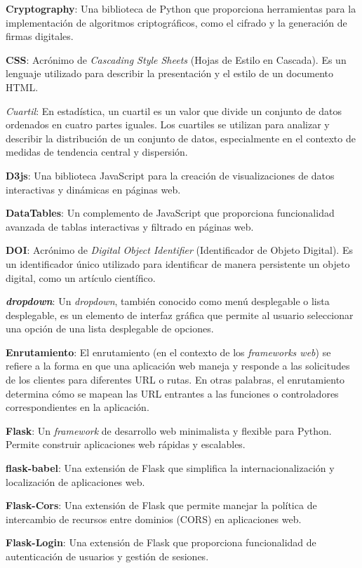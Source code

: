 \textbf{Cryptography}: Una biblioteca de Python que proporciona herramientas para la implementación de algoritmos criptográficos, como el cifrado y la generación de firmas digitales.

\textbf{CSS}: Acrónimo de \textit{Cascading Style Sheets} (Hojas de Estilo en Cascada). Es un lenguaje utilizado para describir la presentación y el estilo de un documento HTML.

\textit{Cuartil}: En estadística, un cuartil es un valor que divide un conjunto de datos ordenados en cuatro partes iguales. Los cuartiles se utilizan para analizar y describir la distribución de un conjunto de datos, especialmente en el contexto de medidas de tendencia central y dispersión.

\textbf{D3js}: Una biblioteca JavaScript para la creación de visualizaciones de datos interactivas y dinámicas en páginas web.

\textbf{DataTables}: Un complemento de JavaScript que proporciona funcionalidad avanzada de tablas interactivas y filtrado en páginas web.

\textbf{DOI}: Acrónimo de \textit{Digital Object Identifier} (Identificador de Objeto Digital). Es un identificador único utilizado para identificar de manera persistente un objeto digital, como un artículo científico.

\textbf{\textit{dropdown}}: Un \textit{dropdown}, también conocido como menú desplegable o lista desplegable, es un elemento de interfaz gráfica que permite al usuario seleccionar una opción de una lista desplegable de opciones. 

\textbf{Enrutamiento}: El enrutamiento (en el contexto de los \textit{frameworks web}) se refiere a la forma en que una aplicación web maneja y responde a las solicitudes de los clientes para diferentes URL o rutas. En otras palabras, el enrutamiento determina cómo se mapean las URL entrantes a las funciones o controladores correspondientes en la aplicación.

\textbf{Flask}: Un \textit{framework} de desarrollo web minimalista y flexible para Python. Permite construir aplicaciones web rápidas y escalables.

\textbf{flask-babel}: Una extensión de Flask que simplifica la internacionalización y localización de aplicaciones web.

\textbf{Flask-Cors}: Una extensión de Flask que permite manejar la política de intercambio de recursos entre dominios (CORS) en aplicaciones web.

\textbf{Flask-Login}: Una extensión de Flask que proporciona funcionalidad de autenticación de usuarios y gestión de sesiones.

